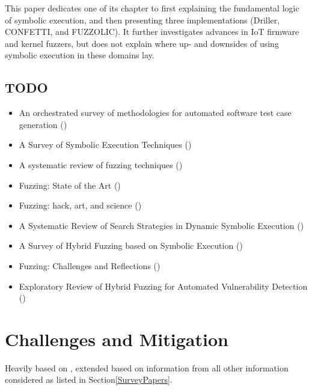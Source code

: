 \documentclass{article}
\begin{document}
\begin{multicols}{2}
    This paper dedicates one of its chapter to first explaining the fundamental logic of symbolic execution, and then presenting three implementations (Driller\cite{Driller}, CONFETTI\cite{CONFETTI}, and FUZZOLIC\cite{FUZZOLIC}). It further investigates advances in IoT firmware and kernel fuzzers, but does not explain where up- and downsides of using symbolic execution in these domains lay.

    \subsection{TODO}
    \begin{itemize}
        \item    An orchestrated survey of methodologies for automated software test case generation ()\cite{Orchestrated}
        \item    A Survey of Symbolic Execution Techniques ()\cite{SurveySymbex}
        \item    A systematic review of fuzzing techniques ()\cite{Science}
        \item    Fuzzing: State of the Art ()\cite{FuzzingStateOfTheArt2018}
        \item    Fuzzing: hack, art, and science ()\cite{HackArtScience}
        \item    A Systematic Review of Search Strategies in Dynamic Symbolic Execution ()\cite{SearchStrategies}
        \item    A Survey of Hybrid Fuzzing based on Symbolic Execution ()\cite{SurveyHybrid}
        \item    Fuzzing: Challenges and Reflections ()\cite{ChallengesAndReflections}
        \item    Exploratory Review of Hybrid Fuzzing for Automated Vulnerability Detection ()\cite{Hybrid}
    \end{itemize}

    \section{Challenges and Mitigation}
    \label{Results}
    Heavily based on \cite{ReviewThreeDecades, PreliminaryAssessment}, extended based on information from all other information considered as listed in Section\ref{SurveyPapers}.


\end{multicols}
\end{document}
